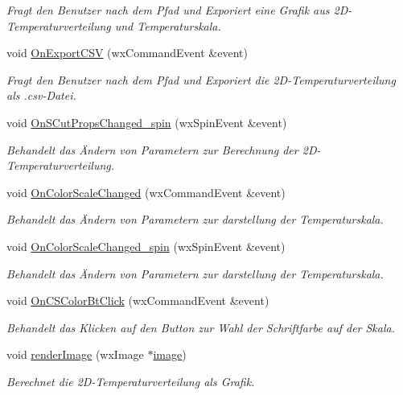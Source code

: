 \begin{DoxyCompactItemize}
\begin{DoxyCompactList}\small\item\em Fragt den Benutzer nach dem Pfad und Exporiert eine Grafik aus 2\-D-\/\-Temperaturverteilung und Temperaturskala. \end{DoxyCompactList}\item 
void \hyperlink{classGUICutRenderWindow_a3aee786d94c840ab4e6df6e3c2817802}{On\-Export\-C\-S\-V} (wx\-Command\-Event \&event)
\begin{DoxyCompactList}\small\item\em Fragt den Benutzer nach dem Pfad und Exporiert die 2\-D-\/\-Temperaturverteilung als .csv-\/\-Datei. \end{DoxyCompactList}\item 
void \hyperlink{classGUICutRenderWindow_a50e92af9db469de6d0298e58eee783ce}{On\-S\-Cut\-Props\-Changed\-\_\-spin} (wx\-Spin\-Event \&event)
\begin{DoxyCompactList}\small\item\em Behandelt das Ändern von Parametern zur Berechnung der 2\-D-\/\-Temperaturverteilung. \end{DoxyCompactList}\item 
void \hyperlink{classGUICutRenderWindow_a25feed7d1598253a25fc9c3bfe4131ec}{On\-Color\-Scale\-Changed} (wx\-Command\-Event \&event)
\begin{DoxyCompactList}\small\item\em Behandelt das Ändern von Parametern zur darstellung der Temperaturskala. \end{DoxyCompactList}\item 
void \hyperlink{classGUICutRenderWindow_a3a2c47b00b30661632dae29eed266438}{On\-Color\-Scale\-Changed\-\_\-spin} (wx\-Spin\-Event \&event)
\begin{DoxyCompactList}\small\item\em Behandelt das Ändern von Parametern zur darstellung der Temperaturskala. \end{DoxyCompactList}\item 
void \hyperlink{classGUICutRenderWindow_a0923a36cdf4e0094d78f623693ff8ac6}{On\-C\-S\-Color\-Bt\-Click} (wx\-Command\-Event \&event)
\begin{DoxyCompactList}\small\item\em Behandelt das Klicken auf den Button zur Wahl der Schriftfarbe auf der Skala. \end{DoxyCompactList}\item 
void \hyperlink{classGUICutRenderWindow_a9eedb7088ad31f4680a77ed3a06fa60c}{render\-Image} (wx\-Image $\ast$\hyperlink{classGUICutRenderWindow_a30c36db74a83fc5523407d3611c1db34}{image})
\begin{DoxyCompactList}\small\item\em Berechnet die 2\-D-\/\-Temperaturverteilung als Grafik. \end{DoxyCompactList}\end{DoxyCompactItemize}
